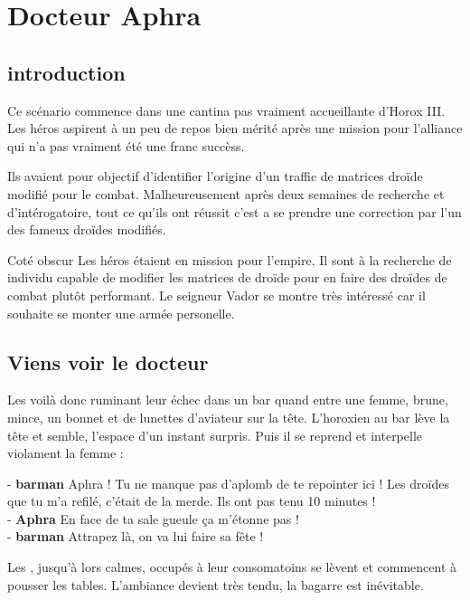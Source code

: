 \section{Docteur Aphra}

\subsection{introduction}
Ce scénario commence dans une cantina pas vraiment accueillante d’Horox III. Les héros aspirent à un peu de repos bien mérité après une mission pour l’alliance qui n’a pas vraiment été une franc succèss.

Ils avaient pour objectif d’identifier l’origine d’un traffic de matrices droïde modifié pour le combat. Malheureusement après deux semaines de recherche et d’intérogatoire, tout ce qu’ils ont réussit c’est a se prendre une correction par l’un des fameux droïdes modifiés. 

\begin{paperbox}{Coté obscur}
Les héros étaient en mission pour l’empire. Il sont à la recherche de individu capable de modifier les matrices de droïde pour en faire des droïdes de combat plutôt performant. Le seigneur Vador se montre très intéressé car il souhaite se monter une armée personelle.
\end{paperbox}

\subsection{Viens voir le docteur}
Les voilà donc ruminant leur échec dans un bar quand entre une femme, brune, mince, un bonnet et de lunettes d’aviateur sur la tête. L’horoxien au bar lève la tête et semble, l’espace d’un instant surpris. Puis il se reprend et interpelle violament la femme :

\begin{quotebox}
- \textbf{barman} Aphra ! Tu ne manque pas d’aplomb de te repointer ici ! Les droïdes que tu m’a refilé, c’était de la merde. Ils ont pas tenu 10 minutes !\\
- \textbf{Aphra} En face de ta sale gueule ça m’étonne pas !\\
- \textbf{barman} Attrapez là, on va lui faire sa fête !
\end{quotebox}

Les , jusqu’à lors calmes, occupés à leur consomatoins se lèvent et commencent à pousser les tables. L’ambiance devient très tendu, la bagarre est inévitable. 

